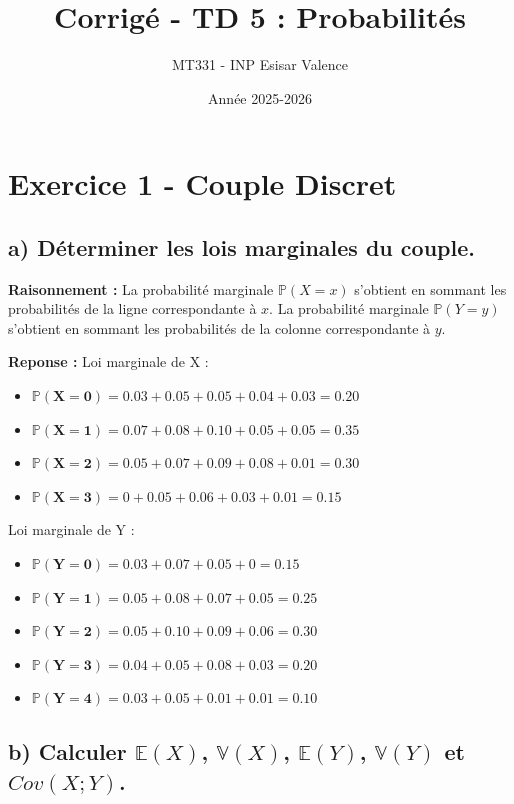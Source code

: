 \documentclass[11pt,a4paper]{article}
\title{Corrigé - TD 5 : Probabilités}
\author{MT331 - INP Esisar Valence}
\date{Année 2025-2026}
\begin{document}
\maketitle

\section*{Exercice 1 - Couple Discret}

\subsection*{a) Déterminer les lois marginales du couple.}

\textbf{Raisonnement :} 
La probabilité marginale $\mathbb{P}(X=x)$ s'obtient en sommant les probabilités de la ligne correspondante à $x$.
La probabilité marginale $\mathbb{P}(Y=y)$ s'obtient en sommant les probabilités de la colonne correspondante à $y$.

\textbf{Reponse :}
Loi marginale de X :
\begin{itemize}
    \item $\mathbf{\mathbb{P}(X=0)} = 0.03 + 0.05 + 0.05 + 0.04 + 0.03 = \mathbf{0.20}$
    \item $\mathbf{\mathbb{P}(X=1)} = 0.07 + 0.08 + 0.10 + 0.05 + 0.05 = \mathbf{0.35}$
    \item $\mathbf{\mathbb{P}(X=2)} = 0.05 + 0.07 + 0.09 + 0.08 + 0.01 = \mathbf{0.30}$
    \item $\mathbf{\mathbb{P}(X=3)} = 0 + 0.05 + 0.06 + 0.03 + 0.01 = \mathbf{0.15}$
\end{itemize}

Loi marginale de Y :
\begin{itemize}
    \item $\mathbf{\mathbb{P}(Y=0)} = 0.03 + 0.07 + 0.05 + 0 = \mathbf{0.15}$
    \item $\mathbf{\mathbb{P}(Y=1)} = 0.05 + 0.08 + 0.07 + 0.05 = \mathbf{0.25}$
    \item $\mathbf{\mathbb{P}(Y=2)} = 0.05 + 0.10 + 0.09 + 0.06 = \mathbf{0.30}$
    \item $\mathbf{\mathbb{P}(Y=3)} = 0.04 + 0.05 + 0.08 + 0.03 = \mathbf{0.20}$
    \item $\mathbf{\mathbb{P}(Y=4)} = 0.03 + 0.05 + 0.01 + 0.01 = \mathbf{0.10}$
\end{itemize}

\subsection*{b) Calculer $\mathbb{E}(X)$, $\mathbb{V}(X)$, $\mathbb{E}(Y)$, $\mathbb{V}(Y)$ et $Cov(X;Y)$.}
\end{document}
